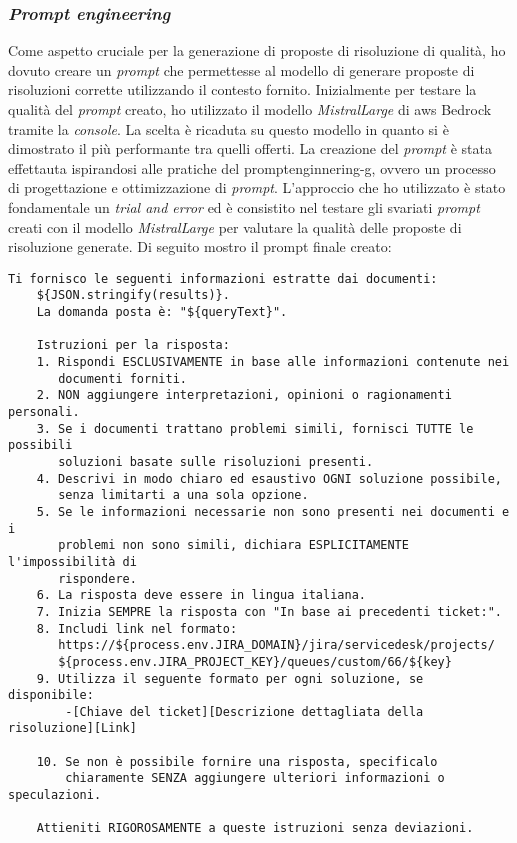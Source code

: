 \subsubsection{\textit{Prompt engineering}}
Come aspetto cruciale per la generazione di proposte di risoluzione di qualità, ho dovuto creare un \textit{prompt} che permettesse al modello di generare proposte di risoluzioni corrette utilizzando il contesto fornito. Inizialmente per testare la qualità del \textit{prompt} creato, ho utilizzato il modello \textit{MistralLarge} di \gls{aws} Bedrock tramite la \textit{console}. La scelta è ricaduta su questo modello in quanto si è dimostrato il più performante tra quelli offerti.
La creazione del \textit{prompt} è stata effettauta ispirandosi alle pratiche del \gls{promptenginnering-g}, ovvero un processo di progettazione e ottimizzazione di \textit{prompt}. L'approccio che ho utilizzato è stato fondamentale un \textit{trial and error} ed è consistito nel testare gli svariati \textit{prompt} creati con il modello \textit{MistralLarge} per valutare la qualità delle proposte di risoluzione generate.
Di seguito mostro il prompt finale creato:
\begin{Verbatim}[frame=single, fontsize=\small]
    Ti fornisco le seguenti informazioni estratte dai documenti:
    ${JSON.stringify(results)}.
    La domanda posta è: "${queryText}".
    
    Istruzioni per la risposta:
    1. Rispondi ESCLUSIVAMENTE in base alle informazioni contenute nei 
       documenti forniti.
    2. NON aggiungere interpretazioni, opinioni o ragionamenti personali.
    3. Se i documenti trattano problemi simili, fornisci TUTTE le possibili 
       soluzioni basate sulle risoluzioni presenti.
    4. Descrivi in modo chiaro ed esaustivo OGNI soluzione possibile, 
       senza limitarti a una sola opzione.
    5. Se le informazioni necessarie non sono presenti nei documenti e i 
       problemi non sono simili, dichiara ESPLICITAMENTE l'impossibilità di 
       rispondere.
    6. La risposta deve essere in lingua italiana.
    7. Inizia SEMPRE la risposta con "In base ai precedenti ticket:".
    8. Includi link nel formato:
       https://${process.env.JIRA_DOMAIN}/jira/servicedesk/projects/
       ${process.env.JIRA_PROJECT_KEY}/queues/custom/66/${key}
    9. Utilizza il seguente formato per ogni soluzione, se disponibile:
        -[Chiave del ticket][Descrizione dettagliata della risoluzione][Link]
    
    10. Se non è possibile fornire una risposta, specificalo 
        chiaramente SENZA aggiungere ulteriori informazioni o speculazioni.
    
    Attieniti RIGOROSAMENTE a queste istruzioni senza deviazioni.
\end{Verbatim}
